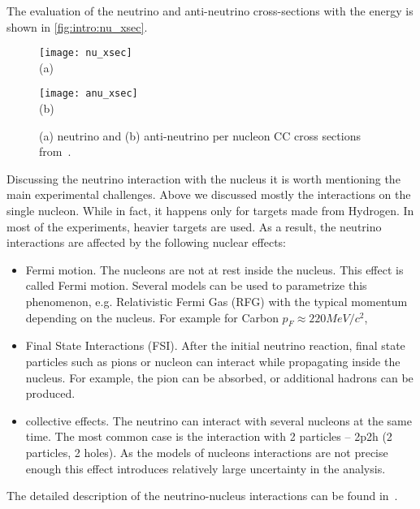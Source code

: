 \documentclass[../main.tex]{subfiles}
\begin{document}
The evaluation of the neutrino and anti-neutrino cross-sections with the energy is shown in \autoref{fig:intro:nu_xsec}.

\begin{figure}[!ht]
  \centering
  \begin{minipage}{0.49\linewidth}
    \centering
    \texttt{[image: nu\_xsec]} \\ (a)
  \end{minipage}
  \begin{minipage}{0.49\linewidth}
    \centering
    \texttt{[image: anu\_xsec]} \\ (b)
  \end{minipage}
  \caption{(a) neutrino and (b) anti-neutrino per nucleon CC cross sections from~\cite{Formaggio2012}.}

  \label{fig:intro:nu_xsec}
\end{figure}

Discussing the neutrino interaction with the nucleus it is worth mentioning the main experimental challenges. Above we discussed mostly the interactions on the single nucleon. While in fact, it happens only for targets made from Hydrogen. In most of the experiments, heavier targets are used. As a result, the neutrino interactions are affected by the following nuclear effects:
\begin{itemize}
  \item Fermi motion. The nucleons are not at rest inside the nucleus. This effect is called Fermi motion. Several models can be used to parametrize this phenomenon, e.g. Relativistic Fermi Gas (RFG) with the typical momentum depending on the nucleus. For example for Carbon $p_F\approx 220 MeV/c^2$,
  \item Final State Interactions (FSI). After the initial neutrino reaction, final state particles such as pions or nucleon can interact while propagating inside the nucleus. For example, the pion can be absorbed, or additional hadrons can be produced.
  \item collective effects. The neutrino can interact with several nucleons at the same time. The most common case is the interaction with 2 particles -- 2p2h (2 particles, 2 holes). As the models of nucleons interactions are not precise enough this effect introduces relatively large uncertainty in the analysis.
\end{itemize}

The detailed description of the neutrino-nucleus interactions can be found in~\cite{Formaggio2012}.
\end{document}
